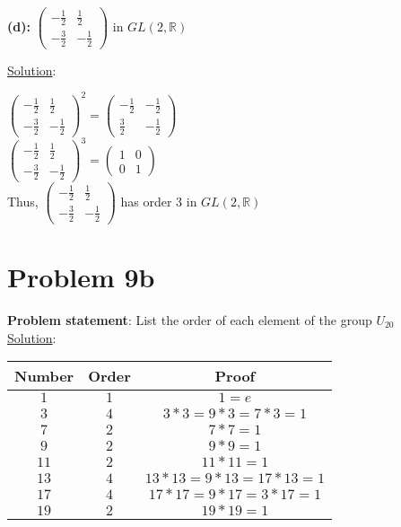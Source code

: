 \documentclass{article} %
\begin{document}
\textbf{(d): } $\left( \begin{matrix} -\frac{1}{2} & \frac{1}{2} \\ -\frac{3}{2} & -\frac{1}{2} \end{matrix} \right)$ in $GL(2,\mathbb{R})$
\begin{addmargin}[1em]{0em}
\underline{Solution}: 
\begin{addmargin}[1em]{0em}
$\left( \begin{matrix}
 -\frac{1}{2} & \frac{1}{2} \\
 -\frac{3}{2} & -\frac{1}{2} 
\end{matrix} \right)^2 = 
\left( \begin{matrix} 
 -\frac{1}{2} & -\frac{1}{2} \\
 \frac{3}{2} & -\frac{1}{2}
\end{matrix} \right)$
\\$\left( \begin{matrix}
 -\frac{1}{2} & \frac{1}{2} \\
 -\frac{3}{2} & -\frac{1}{2} 
\end{matrix} \right)^3 = 
\left( \begin{matrix} 
 1 & 0 \\
 0 & 1
\end{matrix} \right)$
\\Thus, $\left( \begin{matrix}
 -\frac{1}{2} & \frac{1}{2} \\
 -\frac{3}{2} & -\frac{1}{2} 
\end{matrix} \right)$ has order 3 in $GL(2, \mathbb{R})$
\end{addmargin}
\end{addmargin} 

\newpage
\section*{Problem 9b}


\textbf{Problem statement}: List the order of each element of the group $U_{20}$
\\

\underline{Solution}: 
\begin{addmargin}[1em]{0em}
\begin{tabular}{c | c | c}
Number & Order & Proof \\ \hline
$1$ & $1$ & $1 = e$ \\
$3$ & $4$ & $3 * 3 = 9 * 3 = 7 * 3 = 1$\\
$7$ & $2$ & $7 * 7 = 1$\\
$9$ & $2$ & $9 * 9 = 1$\\
$11$ & $2$ & $11 * 11 = 1$\\
$13$ & $4$ & $13 * 13 = 9 * 13 = 17 * 13 = 1$ \\
$17$ & $4$ & $17 * 17 = 9 * 17 = 3 * 17 = 1$\\
$19$ & $2$ & $19 * 19 = 1$ \\
\end{tabular}
\end{addmargin}    
\end{document}
